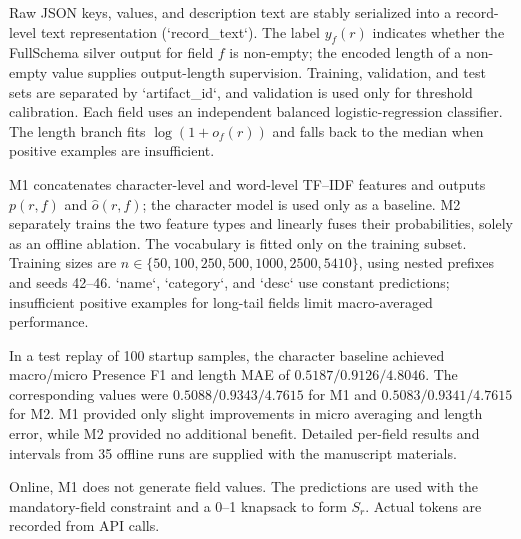 \documentclass[runningheads]{llncs}
\newcommand{\method}{M1}
\newcommand{\full}{FullSchema}
\begin{document}
Raw JSON keys, values, and description text are stably serialized into a record-level text representation (`record_text`). The label $y_f(r)$ indicates whether the \full{} silver output for field $f$ is non-empty; the encoded length of a non-empty value supplies output-length supervision. Training, validation, and test sets are separated by `artifact_id`, and validation is used only for threshold calibration. Each field uses an independent balanced logistic-regression classifier. The length branch fits $\log(1+o_f(r))$ and falls back to the median when positive examples are insufficient.

\method{} concatenates character-level and word-level TF--IDF features and outputs $p(r,f)$ and $\hat{o}(r,f)$; the character model is used only as a baseline. \textsc{M2} separately trains the two feature types and linearly fuses their probabilities, solely as an offline ablation. The vocabulary is fitted only on the training subset. Training sizes are $n\in\{50,100,250,500,1000,2500,5410\}$, using nested prefixes and seeds 42--46. `name`, `category`, and `desc` use constant predictions; insufficient positive examples for long-tail fields limit macro-averaged performance.

\begin{sloppypar}
\setlength{\emergencystretch}{4em}
In a test replay of 100 startup samples, the character baseline achieved macro/micro Presence F1 and length MAE of $0.5187/0.9126/4.8046$. The corresponding values were $0.5088/0.9343/4.7615$ for \method{} and $0.5083/0.9341/4.7615$ for \textsc{M2}. \method{} provided only slight improvements in micro averaging and length error, while \textsc{M2} provided no additional benefit. Detailed per-field results and intervals from 35 offline runs are supplied with the manuscript materials.
\end{sloppypar}

\begin{sloppypar}
Online, \method{} does not generate field values. The predictions are used with the mandatory-field constraint and a 0--1 knapsack to form $S_r$. Actual tokens are recorded from API calls.
\end{sloppypar}
\end{document}
